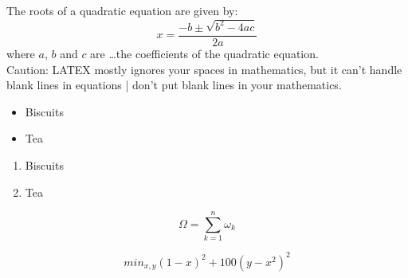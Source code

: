 \documentclass[12pt,a4paper]{article}
\begin{document}
The roots of a quadratic equation are given by: 
\begin{equation}
x = \frac{-b \pm \sqrt{b^2 - 4ac}}
{2a}
\end{equation}
where $a$, $b$ and $c$ are \ldots the coefficients of the quadratic equation. \\[6pt]

Caution: LATEX mostly ignores your spaces in mathematics, but it can't handle blank lines in equations | don't put blank lines in your mathematics.\\[6pt]


\newpage

\begin{itemize} %
\item Biscuits
\item Tea
\end{itemize}


\begin{enumerate} %
\item Biscuits
\item Tea
\end{enumerate}









\begin{equation*}
\Omega = \sum_{k=1}^{n} \omega_k
\end{equation*}



\begin{equation*} %
min_{x,y} (1-x)^2 + 100(y-x^2)^2
\end{equation*}
\end{document}
